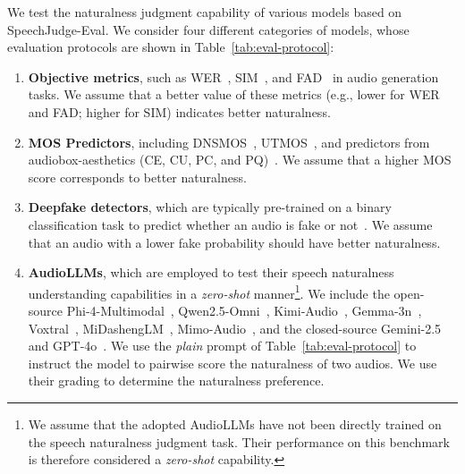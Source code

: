 \documentclass[]{bytedance_seed}
\begin{document}
We test the naturalness judgment capability of various models based on SpeechJudge-Eval. We consider four different categories of models, whose evaluation protocols are shown in Table~\ref{tab:eval-protocol}:
\begin{enumerate}[itemsep=0ex,leftmargin=3ex]
    \item \textbf{Objective metrics}, such as WER~\citep{whisper,funasr}, SIM~\citep{wavlm}, and FAD~\citep{fad} in audio generation tasks. We assume that a better value of these metrics (e.g., lower for WER and FAD; higher for SIM) indicates better naturalness.
    \item \textbf{MOS Predictors}, including DNSMOS~\citep{dnsmos}, UTMOS~\citep{utmos}, and predictors from audiobox-aesthetics (CE, CU, PC, and PQ)~\citep{meta-audiobox-aesthetics}. We assume that a higher MOS score corresponds to better naturalness.
    \item \textbf{Deepfake detectors}, which are typically pre-trained on a binary classification task to predict whether an audio is fake or not~\citep{aasist,audio-deepfake-verification}. We assume that an audio with a lower fake probability should have better naturalness.
    \item \textbf{AudioLLMs}, which are employed to test their speech naturalness understanding capabilities in a \textit{zero-shot} manner\footnote{We assume that the adopted AudioLLMs have not been directly trained on the speech naturalness judgment task. Their performance on this benchmark is therefore considered a \textit{zero-shot} capability.}. We include the open-source Phi-4-Multimodal~\citep{phi4-mm}, Qwen2.5-Omni~\citep{qwen2.5-omni}, Kimi-Audio~\citep{kimi-audio}, Gemma-3n~\citep{gemma3}, Voxtral~\citep{voxtral}, MiDashengLM~\citep{midashenglm}, Mimo-Audio~\citep{mimoaudio}, and the closed-source Gemini-2.5~\citep{gemini2.5} and GPT-4o~\citep{gpt4o}. We use the \textit{plain} prompt of Table~\ref{tab:eval-protocol} to instruct the model to pairwise score the naturalness of two audios. We use their grading to determine the naturalness preference.
\end{enumerate}
\end{document}
